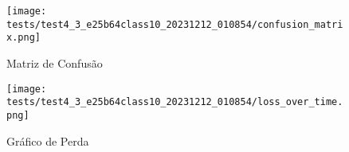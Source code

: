 \begin{figure}[ht]
 \begin{center}
   \texttt{[image: tests/test4\_3\_e25b64class10\_20231212\_010854/confusion\_matrix.png]}
  \caption{Matriz de Confusão}
  \label{fig:fig03}
 \end{center}
\end{figure}

\begin{figure}[ht]
 \begin{center}
   \texttt{[image: tests/test4\_3\_e25b64class10\_20231212\_010854/loss\_over\_time.png]}
  \caption{Gráfico de Perda}
  \label{fig:fig04}
 \end{center}
\end{figure}
